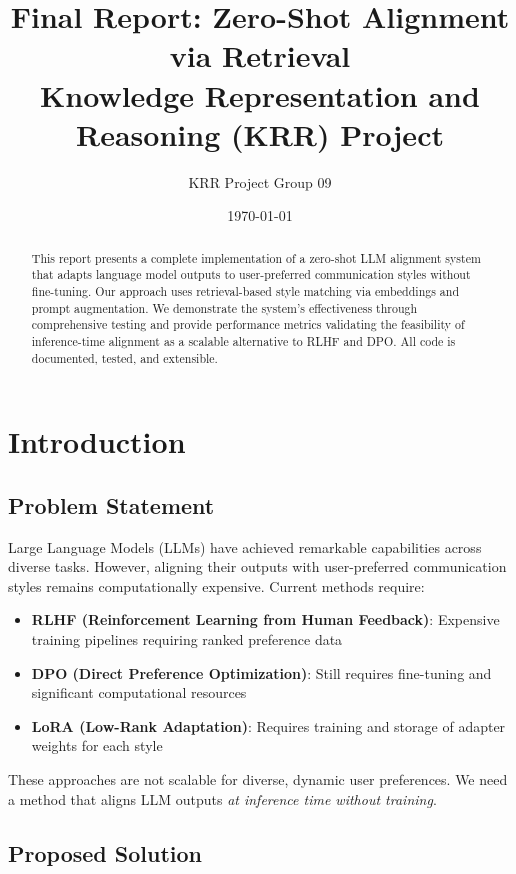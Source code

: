 \documentclass[11pt,a4paper]{article}
\title{\textbf{Final Report: Zero-Shot Alignment via Retrieval}\\
\large Knowledge Representation and Reasoning (KRR) Project}
\author{KRR Project Group 09}
\date{\today}
\begin{document}
\maketitle

\begin{abstract}
This report presents a complete implementation of a zero-shot LLM alignment system that adapts language model outputs to user-preferred communication styles without fine-tuning. Our approach uses retrieval-based style matching via embeddings and prompt augmentation. We demonstrate the system's effectiveness through comprehensive testing and provide performance metrics validating the feasibility of inference-time alignment as a scalable alternative to RLHF and DPO. All code is documented, tested, and extensible.
\end{abstract}

\tableofcontents
\newpage

\section{Introduction}

\subsection{Problem Statement}

Large Language Models (LLMs) have achieved remarkable capabilities across diverse tasks. However, aligning their outputs with user-preferred communication styles remains computationally expensive. Current methods require:

\begin{itemize}
    \item \textbf{RLHF (Reinforcement Learning from Human Feedback)}: Expensive training pipelines requiring ranked preference data
    \item \textbf{DPO (Direct Preference Optimization)}: Still requires fine-tuning and significant computational resources
    \item \textbf{LoRA (Low-Rank Adaptation)}: Requires training and storage of adapter weights for each style
\end{itemize}

These approaches are not scalable for diverse, dynamic user preferences. We need a method that aligns LLM outputs \emph{at inference time without training}.

\subsection{Proposed Solution}
\end{document}
